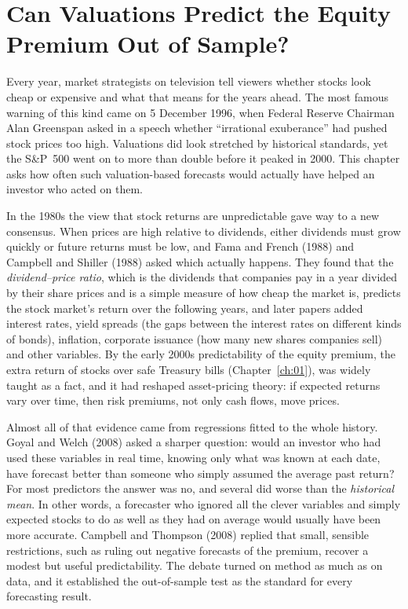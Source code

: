 \makeatletter
\makeatother

\chapter{Can Valuations Predict the Equity Premium Out of Sample?}
\label{ch:06}
\providecommand{\term}[1]{\emph{#1}}

Every year, market strategists on television tell viewers whether stocks look cheap or expensive and what that means for the years ahead. The most famous warning of this kind came on 5 December 1996, when Federal Reserve Chairman Alan Greenspan asked in a speech whether ``irrational exuberance'' had pushed stock prices too high. Valuations did look stretched by historical standards, yet the S\&P~500 went on to more than double before it peaked in 2000. This chapter asks how often such valuation-based forecasts would actually have helped an investor who acted on them.

In the 1980s the view that stock returns are unpredictable gave way to a new consensus. When prices are high relative to dividends, either dividends must grow quickly or future returns must be low, and Fama and French (1988) and Campbell and Shiller (1988) asked which actually happens. They found that the \term{dividend--price ratio}, which is the dividends that companies pay in a year divided by their share prices and is a simple measure of how cheap the market is, predicts the stock market's return over the following years, and later papers added interest rates, yield spreads (the gaps between the interest rates on different kinds of bonds), inflation, corporate issuance (how many new shares companies sell) and other variables. By the early 2000s predictability of the equity premium, the extra return of stocks over safe Treasury bills (Chapter~\ref{ch:01}), was widely taught as a fact, and it had reshaped asset-pricing theory: if expected returns vary over time, then risk premiums, not only cash flows, move prices.

Almost all of that evidence came from regressions fitted to the whole history. Goyal and Welch (2008) asked a sharper question: would an investor who had used these variables in real time, knowing only what was known at each date, have forecast better than someone who simply assumed the average past return? For most predictors the answer was no, and several did worse than the \term{historical mean}. In other words, a forecaster who ignored all the clever variables and simply expected stocks to do as well as they had on average would usually have been more accurate. Campbell and Thompson (2008) replied that small, sensible restrictions, such as ruling out negative forecasts of the premium, recover a modest but useful predictability. The debate turned on method as much as on data, and it established the out-of-sample test as the standard for every forecasting result.

